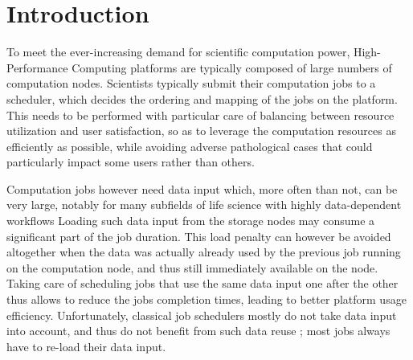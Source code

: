 \documentclass[sigconf,review,anonymous]{acmart}
\newcommand{\rev}[1]{{\color{blue}{#1}}}
\begin{document}
\begin{abstract}
  

\end{abstract}

\maketitle

\section{Introduction}\label{sec.introduction}

To meet the ever-increasing demand for scientific computation power,
High-Performance Computing platforms are typically composed of large
numbers of computation nodes. Scientists typically submit their
computation jobs to a scheduler, which decides the ordering and mapping
of the jobs on the platform. This needs to be performed with particular
care of balancing between resource utilization and user satisfaction, so
as to leverage the computation resources as efficiently as possible,
while avoiding adverse pathological cases that could particularly impact
some users rather than others.

Computation jobs however need data input which, more often than not, can
be very large, notably for many subfields of life science with highly
data-dependent workflows \rev{like taxonomic identification of DNA fragments, genome alignments or ancestral reconstructions. It is a frequent use pattern for users of such communities to submit
large batch of jobs using the same input files.}
Loading such data input from the storage
nodes may consume a significant part of the job duration. This load
penalty can however be avoided altogether when the data was actually
already used by the previous job running on the computation node, and
thus still immediately available on the node. Taking care of scheduling
jobs that use the same data input one after the other thus allows to
reduce the jobs completion times, leading to better platform usage
efficiency. Unfortunately, classical job schedulers mostly do not take
data input into account, and thus do not benefit from such data reuse ;
most jobs always have to re-load their data input.
\end{document}
